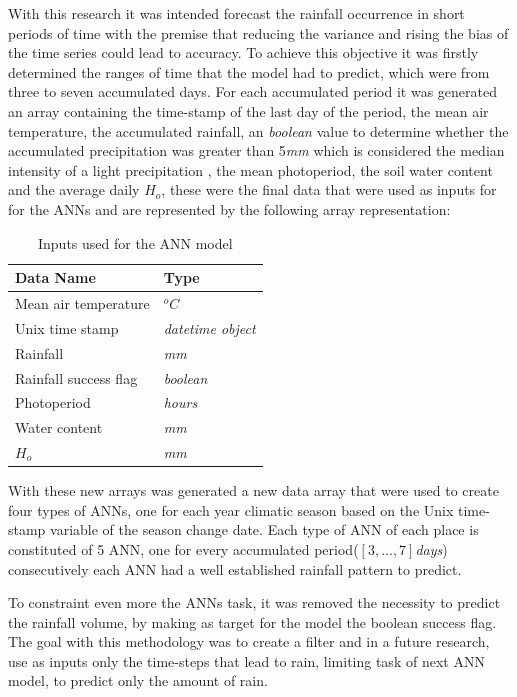 With this research it was intended forecast the rainfall occurrence in short periods of time with the premise that reducing the variance and rising the bias of the time series could lead to accuracy. To achieve this objective it was firstly determined the ranges of time that the model had to predict, which were from three to seven accumulated days. For each accumulated period it was generated an array containing the time-stamp of the last day of the period, the mean air temperature, the accumulated rainfall, an \textit{boolean} value to determine whether the accumulated precipitation was greater than 5\textit{mm} which is considered the median intensity of a light precipitation \cite{sun2006often}, the mean photoperiod, the soil water content and the average daily $H_o$, these were the final data that were used as inputs for for the ANNs and are represented by the following array representation:

\begin{table}[h]
 \caption{Inputs used for the ANN model}
\label{tab:netinputs}
\begin{center}
\begin{tabular}{ll}\hline
Data Name & Type\\\hline
Mean air temperature & $^oC$\\
Unix time stamp & \textit{datetime object}\\
Rainfall & \textit{mm}\\
Rainfall success flag & \textit{boolean}\\
Photoperiod & \textit{hours}\\
Water content & \textit{mm}\\
$H_o$ & \textit{mm}\\
\hline
\end{tabular}
\end{center}
\end{table}

With these new arrays was generated a new data array that were used to create four types of ANNs, one for each year climatic season based on the Unix time-stamp variable of the season change date.
Each type of ANN of each place is constituted of 5 ANN, one for every accumulated period($[3,...,7]$\textit{days}) consecutively each ANN had a well established rainfall pattern to predict.

To constraint even more the ANNs task, it was removed the necessity to predict the rainfall volume, by making as target for the model the boolean success flag. The goal with this methodology was to create a filter and in a future research, use as inputs only the time-steps that lead to rain,
limiting task of next ANN model, to predict only the amount of rain.

